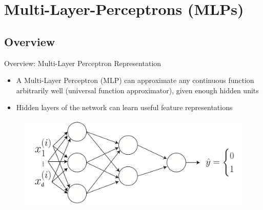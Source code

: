 \section{Multi-Layer-Perceptrons (MLPs)}


\subsection{Overview}

\begin{frame}{Overview: Multi-Layer Perceptron Representation}{}
	\begin{itemize}
		\item A Multi-Layer Perceptron (MLP) can approximate any continuous function arbitrarily well (universal function approximator), given enough hidden units
		\item Hidden layers of the network can learn useful feature representations
	\end{itemize}
	\begin{figure}
		\centering
		\includegraphics[scale=0.45]{10_deep_learning/02_img/mlp}
	\end{figure}
\end{frame}


